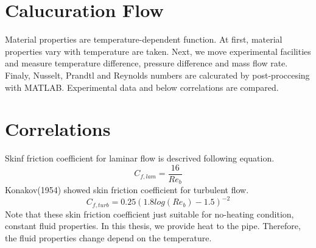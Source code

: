 \documentclass[conference]{IEEEtran}
\begin{document}
\newpage
\section{Calucuration Flow}
Material properties are temperature-dependent function.
At first, material properties vary with temperature are taken.
Next, we move experimental facilities and measure temperature difference, pressure difference and mass flow rate.
Finaly, Nusselt, Prandtl and Reynolds numbers are calcurated by post-proccesing with MATLAB. 
Experimental data and below correlations are compared.

\section{Correlations}
Skinf friction coefficient for laminar flow is descrived following equation.
\begin{equation}
C_{f,lam}=\frac{16}{Re_{b}}
\end{equation}
Konakov(1954) showed skin friction coefficient for turbulent flow.
\begin{equation}
C_{f,turb}=0.25(1.8log(Re_{b})-1.5)^{-2}
\end{equation}
Note that these skin friction coefficient just suitable for no-heating condition, constant fluid properties.
In this thesis, we provide heat to the pipe.
Therefore, the fluid properties change depend on the temperature.
\end{document}
